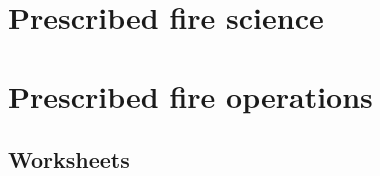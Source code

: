 \documentclass[twoside, 12pt]{tufte-book}
\begin{document}
 
%
%
\begin{titlepage} 
		
	\restoregeometry
\end{titlepage}
%
%
%			 
%
%

%
% 	
	\tableofcontents
\restoregeometry
%
%
\part{Prescribed fire science}
	
	
	
	


\part{Prescribed fire operations}
	
 
 


%
%
\clearpage
\begin{fullwidth} %
 

\clearpage 
\part{Worksheets} 
	
\end{fullwidth}
%
\end{document}
